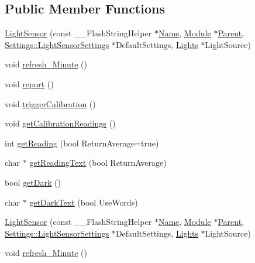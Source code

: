 \subsection*{Public Member Functions}
\begin{DoxyCompactItemize}
\item 
\hyperlink{class_light_sensor_aa2b15bb718f72a125dcc068300abfba7}{Light\+Sensor} (const \+\_\+\+\_\+\+Flash\+String\+Helper $\ast$\hyperlink{class_common_aeea91a726dbe988e515057b32ba0726f}{Name}, \hyperlink{class_module}{Module} $\ast$\hyperlink{class_light_sensor_afc358d440691edea541b12acf84e53c9}{Parent}, \hyperlink{struct_settings_1_1_light_sensor_settings}{Settings\+::\+Light\+Sensor\+Settings} $\ast$Default\+Settings, \hyperlink{class_lights}{Lights} $\ast$Light\+Source)
\item 
void \hyperlink{class_light_sensor_aa6c29591860ab05672a183bc32fce6f4}{refresh\+\_\+\+Minute} ()
\item 
void \hyperlink{class_light_sensor_a08ffec2f2bbb09966a8e37bf1f9887f9}{report} ()
\item 
void \hyperlink{class_light_sensor_a50559883ebb2c80a5d2144a6453bd1c3}{trigger\+Calibration} ()
\item 
void \hyperlink{class_light_sensor_a73dea4504d64c13c43a5c68bee9aef27}{get\+Calibration\+Readings} ()
\item 
int \hyperlink{class_light_sensor_a90177d0d28db7e651f63da45bafcc61b}{get\+Reading} (bool Return\+Average=true)
\item 
char $\ast$ \hyperlink{class_light_sensor_af38ae75a6739383e1590548fdb07e353}{get\+Reading\+Text} (bool Return\+Average)
\item 
bool \hyperlink{class_light_sensor_a06881cb787b1968daf4d1a49923617fe}{get\+Dark} ()
\item 
char $\ast$ \hyperlink{class_light_sensor_a70fd8f7252cbc9abb2ea501ccfaf08fe}{get\+Dark\+Text} (bool Use\+Words)
\item 
\hyperlink{class_light_sensor_aa2b15bb718f72a125dcc068300abfba7}{Light\+Sensor} (const \+\_\+\+\_\+\+Flash\+String\+Helper $\ast$\hyperlink{class_common_aeea91a726dbe988e515057b32ba0726f}{Name}, \hyperlink{class_module}{Module} $\ast$\hyperlink{class_light_sensor_afc358d440691edea541b12acf84e53c9}{Parent}, \hyperlink{struct_settings_1_1_light_sensor_settings}{Settings\+::\+Light\+Sensor\+Settings} $\ast$Default\+Settings, \hyperlink{class_lights}{Lights} $\ast$Light\+Source)
\item 
void \hyperlink{class_light_sensor_aa6c29591860ab05672a183bc32fce6f4}{refresh\+\_\+\+Minute} ()

\end{DoxyCompactItemize}

